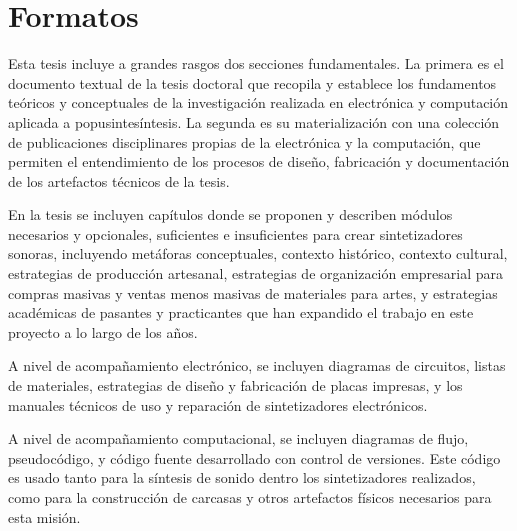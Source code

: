 \documentclass[../proyecto.tex]{subfiles}
\begin{document}
\chapter{Formatos}



Esta tesis incluye a grandes rasgos dos secciones fundamentales. La primera es el documento textual de la tesis doctoral que recopila y establece los fundamentos teóricos y conceptuales de la investigación realizada en electrónica y computación aplicada a popusintesíntesis. La segunda es su materialización con una colección de publicaciones disciplinares propias de la electrónica y la computación, que permiten el entendimiento de los procesos de diseño, fabricación y documentación de los artefactos técnicos de la tesis.

En la tesis se incluyen capítulos donde se proponen y describen módulos necesarios y opcionales, suficientes e insuficientes para crear sintetizadores sonoras, incluyendo metáforas conceptuales, contexto histórico, contexto cultural, estrategias de producción artesanal, estrategias de organización empresarial para compras masivas y ventas menos masivas de materiales para artes, y estrategias académicas de pasantes y practicantes que han expandido el trabajo en este proyecto a lo largo de los años.

A nivel de acompañamiento electrónico, se incluyen diagramas de circuitos, listas de materiales, estrategias de diseño y fabricación de placas impresas, y los manuales técnicos de uso y reparación de sintetizadores electrónicos.

A nivel de acompañamiento computacional, se incluyen diagramas de flujo, pseudocódigo, y código fuente desarrollado con control de versiones. Este código es usado tanto para la síntesis de sonido dentro los sintetizadores realizados, como para la construcción de carcasas y otros artefactos físicos necesarios para esta misión.
\end{document}
